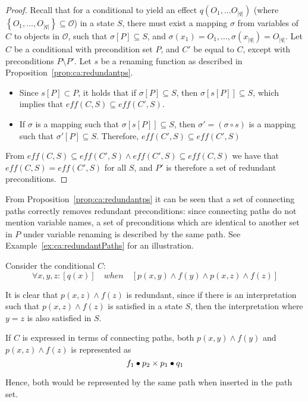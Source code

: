 \documentclass[../Master.tex]{subfiles}
\begin{document}
\begin{proof} 
    Recall that for a conditional to yield an effect $q\left(O_1, \dots O_{|q|}\right)$ (where $\left\{ O_1, \dots, O_{|q|}\right\} \subseteq \mathcal{O}$) in a state $S$, there must exist a mapping $\sigma$ from variables of $C$ to objects in $\mathcal{O}$, such that $\sigma\left[ P \right] \subseteq S$, and $\sigma\left(x_1\right) = O_1, \dots, \sigma\left(x_{|q|}\right) = O_{|q|}$. Let $C$ be a conditional with precondition set $P$, and $C'$ be equal to $C$, except with preconditions $P \setminus P'$. Let $s$ be a renaming function as described in Proposition~\ref{prop:ca:redundantps}.
    \begin{itemize}
        \item Since $s\left[ P \right] \subset P$, it holds that if $\sigma \left[ P \right] \subseteq S$, then $\sigma \left[ s \left[ P \right] \right] \subseteq S$, which implies that $eff(C,S) \subseteq eff(C',S)$.

        \item If $\sigma$ is a mapping such that $\sigma \left[ s \left[ P \right]\right] \subseteq S$, then $\sigma' = \left(\sigma \circ s \right)$ is a mapping such that $\sigma' \left[P\right] \subseteq S$. Therefore, $eff(C', S) \subseteq eff(C', S)$
    \end{itemize}
    From $eff(C, S) \subseteq eff(C',S) \land eff(C',S) \subseteq eff(C, S)$ we have that $eff(C,S) = eff(C',S)$ for all $S$, and $P'$ is therefore a set of redundant preconditions.
\end{proof}

From Proposition~\ref{prop:ca:redundantps} it can be seen that a set of connecting paths correctly removes redundant preconditions: since connecting paths do not mention variable names, a set of preconditions which are identical to another set in $P$ under variable renaming is described by the same path. See Example~\ref{ex:ca:redundantPaths} for an illustration.

\begin{example}\label{ex:ca:redundantPaths}

    Consider the conditional $C$:
    \begin{equation*}
        \forall x, y, z : \left[ q(x) \right] \quad when \quad
        \left[ p(x, y) \land f(y) \land p(x,z) \land f(z) \right]
    \end{equation*}

    It is clear that $p(x,z) \land f(z)$ is redundant, since if there is an interpretation such that $p(x,z) \land f(z)$ is satisfied in a state $S$, then the interpretation where $y = z$ is also satisfied in $S$.

    If $C$ is expressed in terms of connecting paths, both $p(x,y) \land f(y)$ and $p(x,z) \land f(z)$ is represented as 
    \begin{equation*}
        f_1 \bullet p_2 \times p_1 \bullet q_1
    \end{equation*}
    
    Hence, both would be represented by the same path when inserted in the path set.

\end{example}
\end{document}
